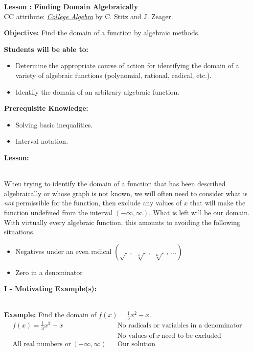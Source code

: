 \documentclass[12pt]{article}
\theoremstyle{definition}
\begin{document}
{\bf \large Lesson : Finding Domain Algebraically}\label{les:finding_domain_algebraically}
\\ CC attribute: \href{http://www.stitz-zeager.com}{\it{College Algebra}} by C. Stitz and J. Zeager. 
\hfill \doclicenseImage[imagewidth=5em]\\
\par
{\bf Objective:} Find the domain of a function by algebraic methods.\\
\par
{\bf Students will be able to:}
\begin{itemize}
	\item Determine the appropriate course of action for identifying the domain of a variety of algebraic functions (polynomial, rational, radical, etc.).
	\item Identify the domain of an arbitrary algebraic function.
\end{itemize}
{\bf Prerequisite Knowledge:}
\begin{itemize}
	\item Solving basic inequalities.
	\item Interval notation.
\end{itemize}
\hrulefill

{\bf Lesson:}\\
\ \par
When trying to identify the domain of a function that has been described algebraically or whose graph is not known, we will often need to consider what is {\it not} permissible for the function, then exclude any values of $x$ that will make the function undefined from the interval $(-\infty,\infty)$.  What is left will be our domain.  With virtually every algebraic function, this amounts to avoiding the following situations.
\begin{itemize}
	\item Negatives under an even radical $\left(\sqrt{~}~,~~\sqrt[4]{~}~,~~\sqrt[6]{~}~,~\ldots\right)$
	\item Zero in a denominator
\end{itemize}
{\bf I - Motivating Example(s):}\\
\ \par
{\bf Example:} Find the domain of $f(x)=\frac{1}{3} x^2-x$.
  \begin{eqnarray*}
    f (x) = \frac{1}{3} x^2 - x & & \text{No radicals or variables in a denominator}\\
		& & \text{No values of} \ x \ \text{need to be excluded}\\
		\text{All real numbers or} \ (-\infty,\infty) & & \text{Our solution}
 \end{eqnarray*}
\end{document}
